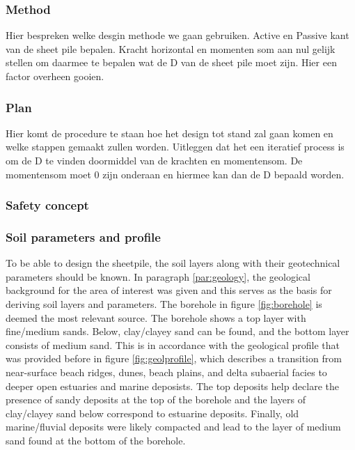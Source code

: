 \subsubsection{Method}

Hier bespreken welke desgin methode we gaan gebruiken. Active en Passive kant van de sheet pile bepalen. Kracht horizontal en momenten som aan nul gelijk stellen om daarmee te bepalen wat de D van de sheet pile moet zijn. Hier een factor overheen gooien. 

\subsubsection{Plan}

Hier komt de procedure te staan hoe het design tot stand zal gaan komen en welke stappen gemaakt zullen worden. Uitleggen dat het een iteratief process is om de D te vinden doormiddel van de krachten en momentensom. De momentensom moet 0 zijn onderaan en hiermee kan dan de D bepaald worden. \textbf{}

\subsubsection{Safety concept}

\subsubsection{Soil parameters and profile}
To be able to design the sheetpile, the soil layers along with their geotechnical parameters should be known. In paragraph \ref{par:geology}, the geological background for the area of interest was given and this serves as the basis for deriving soil layers and parameters. The borehole in figure \ref{fig:borehole} is deemed the most relevant source. The borehole shows a top layer with fine/medium sands. Below, clay/clayey sand can be found, and the bottom layer consists of medium sand. This is in accordance with the geological profile that was provided before in figure \ref{fig:geolprofile}, which describes a transition from near-surface beach ridges, dunes, beach plains, and delta subaerial facies to deeper open estuaries and marine deposists. The top deposits help declare the presence of sandy deposits at the top of the borehole and the layers of clay/clayey sand below correspond to estuarine deposits. Finally, old marine/fluvial deposits were likely compacted and lead to the layer of medium sand found at the bottom of the borehole.


